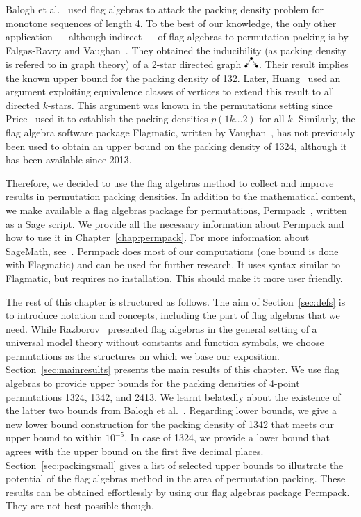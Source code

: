 \documentclass[12pt, a4paper, twoside]{report}
\begin{document}
Balogh et al.~\cite{balogh2015minimum} used flag algebras to attack the packing density problem for monotone sequences of length 4. To the best of our knowledge, the only other application --- although indirect --- of flag algebras to permutation packing is by Falgas-Ravry and Vaughan~\cite{falgas2013applications}. They obtained the inducibility (as packing density is refered to in graph theory) of a 2-star directed graph $\outstar$. Their result implies the known upper bound for the packing density of 132. Later, Huang~\cite{huang2014stars} used an argument exploiting equivalence classes of vertices to extend this result to all directed $k$-stars. This argument was known in the permutations setting since Price~\cite{price1997packing} used it to establish the packing densities $p(1k\ldots 2)$ for all $k$. Similarly, the flag algebra software package Flagmatic, written by Vaughan~\cite{flagmatic}, has not previously been used to obtain an upper bound on the packing density of 1324, although it has been available since 2013.

Therefore, we decided to use the flag algebras method to collect and improve results in permutation packing densities. In addition to the mathematical content, we make available a flag algebras package for permutations, \href{http://jsliacan.github.io/permpack/}{Permpack}~\cite{permpack}, written as a \href{http://sagemath.org}{Sage} script. We provide all the necessary information about Permpack and how to use it in Chapter~\ref{chap:permpack}. For more information about SageMath, see~\cite{sagemath}. Permpack does most of our computations (one bound is done with Flagmatic) and can be used for further research. It uses syntax similar to Flagmatic, but requires no installation. This should make it more user friendly.

The rest of this chapter is structured as follows. The aim of Section~\ref{sec:defs} is to introduce notation and concepts, including the part of flag algebras that we need. While Razborov~\cite{razborov2007original} presented flag algebras in the general setting of a universal model theory without constants and function symbols, we choose permutations as the structures on which we base our exposition. Section~\ref{sec:mainresults} presents the main results of this chapter. We use flag algebras to provide upper bounds for the packing densities of 4-point permutations 1324, 1342, and 2413. We learnt belatedly about the existence of the latter two bounds from Balogh et al.~\cite{balogh2015minimum}. Regarding lower bounds, we give a new lower bound construction for the packing density of 1342 that meets our upper bound to within $10^{-5}$. In case of 1324, we provide a lower bound that agrees with the upper bound on the first five decimal places. Section~\ref{sec:packingsmall} gives a list of selected upper bounds to illustrate the potential of the flag algebras method in the area of permutation packing. These results can be obtained effortlessly by using our flag algebras package Permpack. They are not best possible though.
\end{document}

